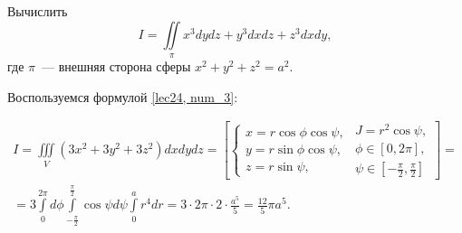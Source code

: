 \documentclass[../../main.tex]{subfiles}
\begin{document}
\begin{example}
	Вычислить \[I = \iint\limits_\pi x^3dydz + y^3dxdz + z^3dxdy,\] где $\pi$~---
	внешняя сторона сферы $x^2 + y^2 + z^2 = a^2.$
	 
	Воспользуемся формулой \eqref{lec24, num_3}:
	
	\begin{multline*}I=\iiint\limits_V (3x^2 + 3y^2 + 3z^2)dxdydz = \left[ \begin{cases}x=
	 r\cos\phi \cos\psi,\\ y=r\sin\phi\cos\psi, \\ z=r\sin\psi,\end{cases}
	\begin{gathered}J =r^2\cos\psi,\\ \phi\in[0, 2\pi], \\ \textstyle\psi\in\left[-\frac{\pi}{2},
	  \frac{\pi}{2}\right]\end{gathered}\right]=\\ =3\int\limits_0^{2\pi}d\phi\int\limits
	  _{-\frac{\pi}{2}}^{\frac{\pi}{2}}\cos\psi d\psi\int\limits_0^a r^4 dr=
	  3\cdot2\pi\cdot2\cdot\frac{a^5}5 = 
	  \frac{12}{5}\pi a^5.\end{multline*}
\end{example}
\end{document}
